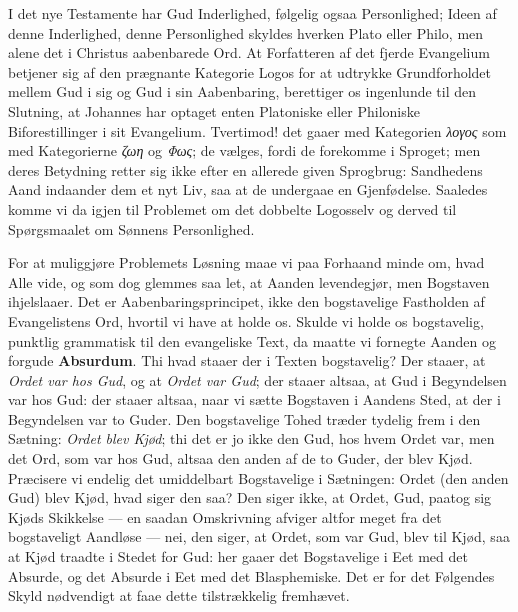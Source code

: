 \documentclass[12pt]{book}
\begin{document}
I det nye Testamente har Gud Inderlighed, følgelig ogsaa
Personlighed; Ideen af denne Inderlighed, denne Personlighed skyldes
hverken Plato eller Philo, men alene det i Christus aabenbarede Ord.
At Forfatteren af det fjerde Evangelium betjener sig af den
prægnante Kategorie Logos for at udtrykke Grundforholdet mellem Gud
i sig og Gud i sin Aabenbaring, berettiger os ingenlunde til den
Slutning, at Johannes har optaget enten Platoniske eller Philoniske
Biforestillinger i sit Evangelium. Tvertimod! det gaaer med
Kategorien \textit{λογος} som med Kategorierne \textit{ζωη} og
\textit{Φως}; de vælges, fordi de forekomme i Sproget; men deres
Betydning retter sig ikke efter en allerede given Sprogbrug:
Sandhedens Aand indaander dem et nyt Liv, saa at de undergaae en
Gjenfødelse.
Saaledes komme vi da igjen til Problemet om det
dobbelte Logosselv og derved til Spørgsmaalet om Sønnens
Personlighed.

For at muliggjøre Problemets Løsning maae vi paa Forhaand minde om,
hvad Alle vide, og som dog glemmes saa let, at Aanden levendegjør,
men Bogstaven ihjelslaaer. Det er Aabenbaringsprincipet, ikke den
bogstavelige Fastholden af Evangelistens Ord, hvortil vi have at
holde os. Skulde vi holde os bogstavelig, punktlig grammatisk til
den evangeliske Text, da maatte vi fornegte Aanden og forgude
\textbf{Absurdum}.
Thi hvad staaer der i Texten bogstavelig? Der
staaer, at \emph{Ordet var hos Gud}, og at \emph{Ordet var Gud}; der
staaer altsaa, at Gud
i Begyndelsen var hos Gud: der staaer altsaa, naar vi sætte
Bogstaven i Aandens Sted, at der i Begyndelsen var to Guder. Den
bogstavelige Tohed træder tydelig frem i den Sætning: \emph{Ordet
blev Kjød}; thi det er jo ikke den Gud, hos hvem Ordet var, men det
Ord, som var hos Gud, altsaa den anden af de to Guder, der blev
Kjød. Præcisere vi endelig det umiddelbart Bogstavelige i
Sætningen: Ordet (den anden Gud) blev Kjød, hvad siger den saa? Den
siger ikke, at Ordet, Gud, paatog sig Kjøds Skikkelse --- en saadan
Omskrivning afviger altfor meget fra det bogstaveligt Aandløse ---
nei, den siger, at Ordet, som var Gud, blev til Kjød, saa at Kjød
traadte i Stedet for Gud: her gaaer det Bogstavelige i Eet med det
Absurde, og det Absurde i Eet med det Blasphemiske. Det er for det
Følgendes Skyld nødvendigt at faae dette tilstrækkelig fremhævet.
\end{document}
